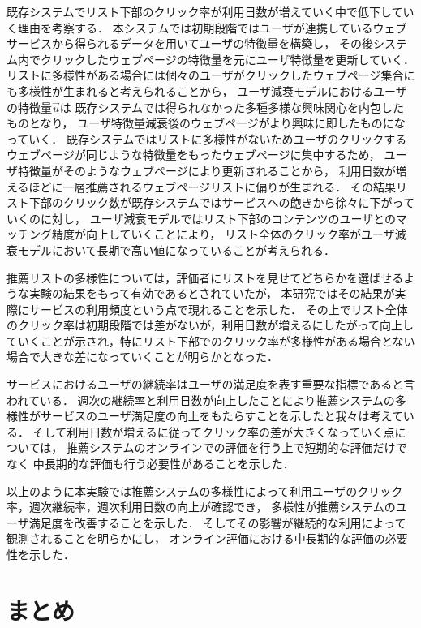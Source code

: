 \documentclass[japanese]{jnlp_1.4}
\begin{document}
既存システムでリスト下部のクリック率が利用日数が増えていく中で低下していく理由を考察する．
本システムでは初期段階ではユーザが連携しているウェブサービスから得られるデータを用いてユーザの特徴量を構築し，
その後システム内でクリックしたウェブページの特徴量を元にユーザ特徴量を更新していく．
リストに多様性がある場合には個々のユーザがクリックしたウェブページ集合にも多様性が生まれると考えられることから，
ユーザ減衰モデルにおけるユーザの特徴量$\vec{u}$は
既存システムでは得られなかった多種多様な興味関心を内包したものとなり，
ユーザ特徴量減衰後のウェブページがより興味に即したものになっていく．
既存システムではリストに多様性がないためユーザのクリックするウェブページが同じような特徴量をもったウェブページに集中するため，
ユーザ特徴量がそのようなウェブページにより更新されることから，
利用日数が増えるほどに一層推薦されるウェブページリストに偏りが生まれる．
その結果リスト下部のクリック数が既存システムではサービスへの飽きから徐々に下がっていくのに対し，
ユーザ減衰モデルではリスト下部のコンテンツのユーザとのマッチング精度が向上していくことにより，
リスト全体のクリック率がユーザ減衰モデルにおいて長期で高い値になっていることが考えられる．

推薦リストの多様性については，評価者にリストを見せてどちらかを選ばせるような実験の結果をもって有効であるとされていたが，
本研究ではその結果が実際にサービスの利用頻度という点で現れることを示した．
その上でリスト全体のクリック率は初期段階では差がないが，利用日数が増えるにしたがって向上していくことが示され，特にリスト下部でのクリック率が多様性がある場合とない場合で大きな差になっていくことが明らかとなった．

サービスにおけるユーザの継続率はユーザの満足度を表す重要な指標であると言われている\cite{RUST1993}．
週次の継続率と利用日数が向上したことにより推薦システムの多様性がサービスのユーザ満足度の向上をもたらすことを示したと我々は考えている．
そして利用日数が増えるに従ってクリック率の差が大きくなっていく点については，
推薦システムのオンラインでの評価を行う上で短期的な評価だけでなく
中長期的な評価も行う必要性があることを示した．

以上のように本実験では推薦システムの多様性によって利用ユーザのクリック率，週次継続率，週次利用日数の向上が確認でき，
多様性が推薦システムのユーザ満足度を改善することを示した．
そしてその影響が継続的な利用によって観測されることを明らかにし，
オンライン評価における中長期的な評価の必要性を示した．


\section{まとめ}
\label{sec:conclusion}
\end{document}

